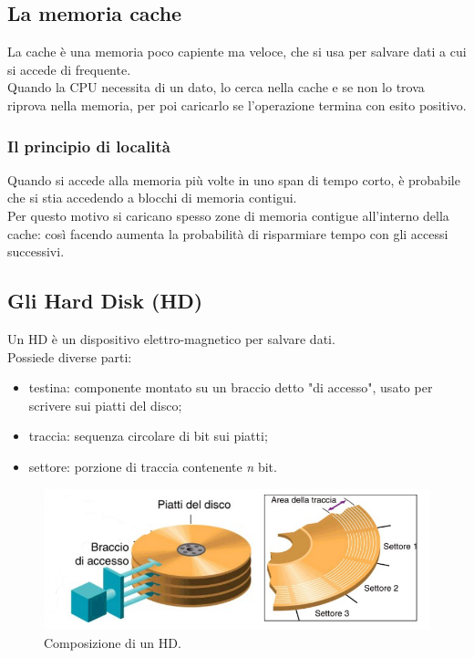 \documentclass[12pt]{article}
\begin{document}
\subsection{La memoria cache}
La cache è una memoria poco capiente ma veloce, che si usa per salvare dati a cui si accede di frequente.\\
Quando la CPU necessita di un dato, lo cerca nella cache e se non lo trova riprova nella memoria, per poi caricarlo se l'operazione termina con esito positivo.
\subsubsection{Il principio di località}
Quando si accede alla memoria più volte in uno span di tempo corto, è probabile che si stia accedendo a blocchi di memoria contigui.\\
Per questo motivo si caricano spesso zone di memoria contigue all'interno della cache: così facendo aumenta la probabilità di risparmiare tempo con gli accessi successivi.
\pagebreak
\subsection{Gli Hard Disk (HD)}
Un HD è un dispositivo elettro-magnetico per salvare dati.\\
Possiede diverse parti:
\begin{itemize}
    \item testina: componente montato su un braccio detto "di accesso", usato per scrivere sui piatti del disco;
    \item traccia: sequenza circolare di bit sui piatti;
    \item settore: porzione di traccia contenente \textit{n} bit.
\end{itemize}
\begin{figure}[!htb]
    \centering
    \includegraphics[width=.9\textwidth, height=.7\textheight,keepaspectratio]{organizzazione_elab/hd.png} %
    \begin{center}
        \caption{\label{fig:hd_struttura}Composizione di un HD.} %
    \end{center}
\end{figure}
\end{document}
